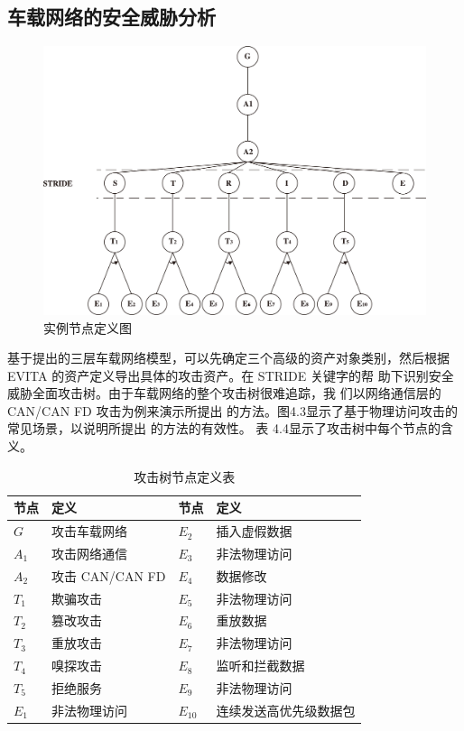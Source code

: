 \subsection{车载网络的安全威胁分析}
\begin{figure}
  \centering
  \includegraphics[scale=0.5]{resources/img/i31.jpg}
  \caption{实例节点定义图}
\end{figure}
基于提出的三层车载网络模型，可以先确定三个高级的资产对象类别，然后根据 EVITA\cite{dominic2016risk}
的资产定义导出具体的攻击资产。在 STRIDE 关键字的帮
助下识别安全威胁全面攻击树。由于车载网络的整个攻击树很难追踪，我
们以网络通信层的 CAN/CAN FD\cite{reindl2021comparative} \cite{zago2017quantitative} 攻击为例来演示所提出
的方法。图4.3显示了基于物理访问攻击的常见场景，以说明所提出
的方法的有效性。
表 4.4显示了攻击树中每个节点的含
义。
\begin{table}
  \caption{攻击树节点定义表}
\begin{center}
    \begin{tabular}{|l|l|l|l|}
      \hline 节点 & 定义 & 节点 & 定义 \\
      \hline $G$ & 攻击车载网络 & $E_2$ & 插入虚假数据 \\
      \hline $A_1$ & 攻击网络通信 & $E_3$ & 非法物理访问 \\
      \hline $A_2$ & 攻击 CAN/CAN FD & $E_4$ &数据修改 \\
      \hline $T_1$ & 欺骗攻击 & $E_5$ & 非法物理访问 \\
      \hline $T_2$ & 篡改攻击 & $E_6$ & 重放数据 \\
      \hline $T_3$ & 重放攻击 & $E_7$ & 非法物理访问 \\
      \hline $T_4$ & 嗅探攻击 & $E_8$ & 监听和拦截数据 \\
      \hline $T_5$ & 拒绝服务 & $E_9$ & 非法物理访问 \\
      \hline $E_1$ & 非法物理访问 & $E_{10}$ & 连续发送高优先级数据包 \\\hline
      \end{tabular}
  \end{center}
\end{table}
